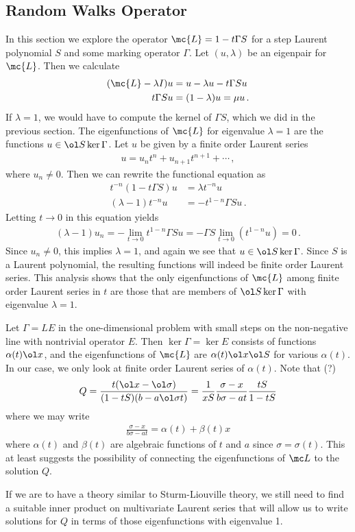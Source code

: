 \subsection{Random Walks Operator}
In this section we explore the operator $\mc{L} = 1 - t\Gamma S$ for a step Laurent polynomial $S$ and some marking operator $\Gamma$. Let $(u, \lambda)$ be an eigenpair for $\mc{L}$. Then we calculate
\begin{align}\begin{split}
	(\mc{L}-\lambda I) u &= u - \lambda u -t\Gamma Su\\
	t \Gamma S u &= (1-\lambda)u = \mu u\,.
\end{split}\end{align}
If $\lambda = 1$, we would have to compute the kernel of $\Gamma S$, which we did in the previous section. The eigenfunctions of $\mc{L}$ for eigenvalue $\lambda = 1$ are the functions $u \in \ol S\ker{\Gamma}$. Let $u$ be given by a finite order Laurent series
\begin{align}
	u = u_n t^n + u_{n+1}t^{n+1} + \cdots\,,
\end{align}
where $u_n \neq 0$. Then we can rewrite the functional equation as
\begin{align}
	t^{-n}(1-t\Gamma S)u &= \lambda t^{-n}u\\
	(\lambda -1) t^{-n}u &= -t^{1-n}\Gamma Su\,.
\end{align}
Letting $t \to 0$ in this equation yields
\begin{align}
	(\lambda - 1)u_n = -\lim_{t\to 0} t^{1-n}\Gamma S u = -\Gamma S \lim_{t\to 0} (t^{1-n} u) = 0\,.
\end{align}
Since $u_n \neq 0$, this implies $\lambda = 1$, and again we see that $u \in \ol S\ker \Gamma$. Since $S$ is a Laurent polynomial, the resulting functions will indeed be finite order Laurent series. This analysis shows that the only eigenfunctions of $\mc{L}$ among finite order Laurent series in $t$ are those that are members of $\ol S \ker \Gamma$ with eigenvalue $\lambda = 1$.
\begin{example} Let $\Gamma = LE$ in the one-dimensional problem with small steps on the non-negative line with nontrivial operator $E$. Then $\ker \Gamma = \ker E$ consists of functions $\alpha(t) \ol x$, and the eigenfunctions of $\mc{L}$ are $\alpha(t)\ol x \ol S$ for various $\alpha(t)$. In our case, we only look at finite order Laurent series of $\alpha(t)$. Note that (?)
\begin{align}
	Q = \frac{t(\ol x - \ol \sigma)}{(1-tS)(b-a\ol \sigma t)} = \frac{1}{xS}\frac{\sigma - x}{b\sigma - at}\frac{tS}{1-tS}
\end{align}
where we may write
\begin{align}
	\frac{\sigma - x}{b\sigma - at} = \alpha(t) + \beta(t)x
\end{align}
where $\alpha(t)$ and $\beta(t)$ are algebraic functions of $t$ and $a$ since $\sigma = \sigma(t)$. This at least suggests the possibility of connecting the eigenfunctions of $\mc L$ to the solution $Q$.
\end{example}

If we are to have a theory similar to Sturm-Liouville theory, we still need to find a suitable inner product on multivariate Laurent series that will allow us to write solutions for $Q$ in terms of those eigenfunctions with eigenvalue 1.


\endinput
